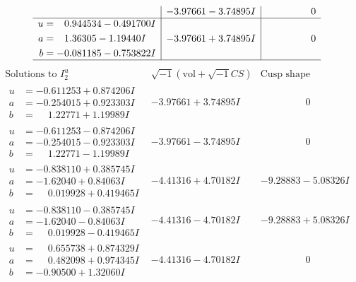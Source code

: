 \documentclass[1p]{elsarticle_modified}
\theoremstyle{definition}
\newcommand{\I}{\sqrt{-1}}
\begin{document}
$$\begin{array}{c|c|c}
 & -3.97661 - 3.74895 I & \phantom{-0.000000 } 0 \\ \hline\begin{aligned}
u &= \phantom{-}0.944534 - 0.491700 I \\
a &= \phantom{-}1.36305 - 1.19440 I \\
b &= -0.081185 - 0.753822 I\end{aligned}
 & -3.97661 + 3.74895 I & \phantom{-0.000000 } 0\\
 \hline 
 \end{array}$$\newpage$$\begin{array}{c|c|c}  
\text{Solutions to }I^u_{2}& \I (\text{vol} + \sqrt{-1}CS) & \text{Cusp shape}\\
 \hline 
\begin{aligned}
u &= -0.611253 + 0.874206 I \\
a &= -0.254015 + 0.923303 I \\
b &= \phantom{-}1.22771 + 1.19989 I\end{aligned}
 & -3.97661 + 3.74895 I & \phantom{-0.000000 } 0 \\ \hline\begin{aligned}
u &= -0.611253 - 0.874206 I \\
a &= -0.254015 - 0.923303 I \\
b &= \phantom{-}1.22771 - 1.19989 I\end{aligned}
 & -3.97661 - 3.74895 I & \phantom{-0.000000 } 0 \\ \hline\begin{aligned}
u &= -0.838110 + 0.385745 I \\
a &= -1.62040 + 0.84063 I \\
b &= \phantom{-}0.019928 + 0.419465 I\end{aligned}
 & -4.41316 + 4.70182 I & -9.28883 - 5.08326 I \\ \hline\begin{aligned}
u &= -0.838110 - 0.385745 I \\
a &= -1.62040 - 0.84063 I \\
b &= \phantom{-}0.019928 - 0.419465 I\end{aligned}
 & -4.41316 - 4.70182 I & -9.28883 + 5.08326 I \\ \hline\begin{aligned}
u &= \phantom{-}0.655738 + 0.874329 I \\
a &= \phantom{-}0.482098 + 0.974345 I \\
b &= -0.90500 + 1.32060 I\end{aligned}
 & -4.41316 - 4.70182 I & \phantom{-0.000000 } 0 \\ \hline\begin{aligned}

\end{aligned}
\end{array}$$
\end{document}
